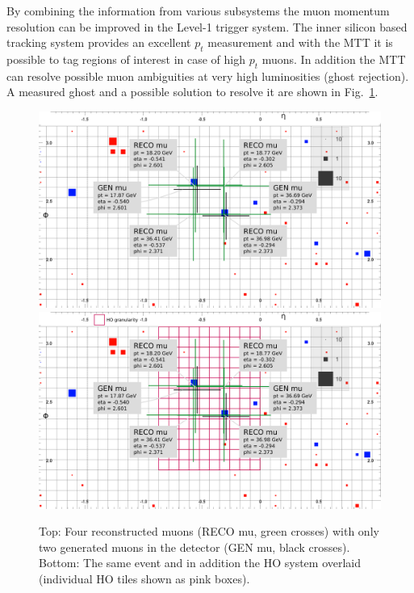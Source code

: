 By combining the information from various subsystems the muon momentum resolution can be improved in the Level-1 trigger system. The inner silicon based tracking system provides 
an excellent $p_t$ measurement and with the MTT it is possible to tag regions of interest in case of high $p_t$ muons. In addition the MTT can resolve possible muon 
ambiguities at very high luminosities (ghost rejection). A measured ghost and a possible solution to resolve it are shown in Fig.~\ref{fig:ghosts}.
\begin{figure}[htbp]
\centering
\includegraphics[width=\textwidth]{Figures/pooth/GhostEvent01.png}
\includegraphics[width=\textwidth]{Figures/pooth/GhostEvent02.png}
\caption{Top: Four reconstructed muons (RECO mu, green crosses) with only two generated muons in the detector (GEN mu, black crosses). 
Bottom: The same event and in addition the HO system overlaid (individual HO tiles shown as pink boxes).} 
\label{fig:ghosts}
\end{figure}